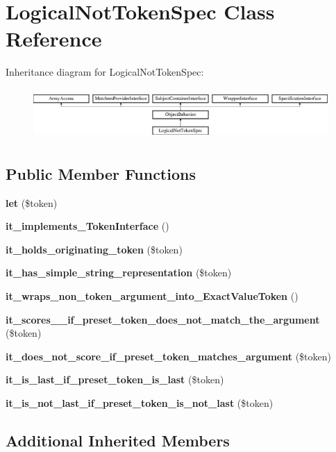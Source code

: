 \section{Logical\+Not\+Token\+Spec Class Reference}
\label{classspec_1_1_prophecy_1_1_argument_1_1_token_1_1_logical_not_token_spec}
Inheritance diagram for Logical\+Not\+Token\+Spec\+:\begin{figure}[H]
\begin{center}
\leavevmode
\includegraphics[height=1.953488cm]{classspec_1_1_prophecy_1_1_argument_1_1_token_1_1_logical_not_token_spec}
\end{center}
\end{figure}
\subsection*{Public Member Functions}
\begin{DoxyCompactItemize}
\item 
{\bf let} (\$token)
\item 
{\bf it\+\_\+implements\+\_\+\+Token\+Interface} ()
\item 
{\bf it\+\_\+holds\+\_\+originating\+\_\+token} (\$token)
\item 
{\bf it\+\_\+has\+\_\+simple\+\_\+string\+\_\+representation} (\$token)
\item 
{\bf it\+\_\+wraps\+\_\+non\+\_\+token\+\_\+argument\+\_\+into\+\_\+\+Exact\+Value\+Token} ()
\item 
{\bf it\+\_\+scores\+\_\+\_\+if\+\_\+preset\+\_\+token\+\_\+does\+\_\+not\+\_\+match\+\_\+the\+\_\+argument} (\$token)
\item 
{\bf it\+\_\+does\+\_\+not\+\_\+score\+\_\+if\+\_\+preset\+\_\+token\+\_\+matches\+\_\+argument} (\$token)
\item 
{\bf it\+\_\+is\+\_\+last\+\_\+if\+\_\+preset\+\_\+token\+\_\+is\+\_\+last} (\$token)
\item 
{\bf it\+\_\+is\+\_\+not\+\_\+last\+\_\+if\+\_\+preset\+\_\+token\+\_\+is\+\_\+not\+\_\+last} (\$token)
\end{DoxyCompactItemize}
\subsection*{Additional Inherited Members}


